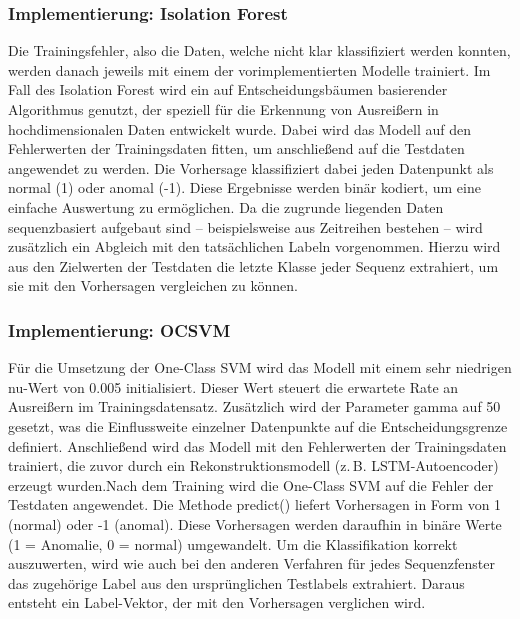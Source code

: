 \documentclass[a4paper,12pt]{article}
\begin{document}
	\subsubsection{Implementierung: Isolation Forest}
	Die Trainingsfehler, also die Daten, welche nicht klar klassifiziert werden konnten, werden danach jeweils mit einem der vorimplementierten Modelle trainiert. Im Fall des Isolation Forest wird ein auf Entscheidungsbäumen basierender Algorithmus genutzt, der speziell für die Erkennung von Ausreißern in hochdimensionalen Daten entwickelt wurde. Dabei wird das Modell auf den Fehlerwerten der Trainingsdaten fitten, um anschließend auf die Testdaten angewendet zu werden. Die Vorhersage klassifiziert dabei jeden Datenpunkt als normal (1) oder anomal (-1). Diese Ergebnisse werden binär kodiert, um eine einfache Auswertung zu ermöglichen. Da die zugrunde liegenden Daten sequenzbasiert aufgebaut sind – beispielsweise aus Zeitreihen bestehen – wird zusätzlich ein Abgleich mit den tatsächlichen Labeln vorgenommen. Hierzu wird aus den Zielwerten der Testdaten die letzte Klasse jeder Sequenz extrahiert, um sie mit den Vorhersagen vergleichen zu können.
	
	\subsubsection{Implementierung: OCSVM}
	Für die Umsetzung der One-Class SVM wird das Modell mit einem sehr niedrigen nu-Wert von 0.005 initialisiert. Dieser Wert steuert die erwartete Rate an Ausreißern im Trainingsdatensatz. Zusätzlich wird der Parameter gamma auf 50 gesetzt, was die Einflussweite einzelner Datenpunkte auf die Entscheidungsgrenze definiert. Anschließend wird das Modell mit den Fehlerwerten der Trainingsdaten trainiert, die zuvor durch ein Rekonstruktionsmodell (z.\,B. LSTM-Autoencoder) erzeugt wurden.Nach dem Training wird die One-Class SVM auf die Fehler der Testdaten angewendet. Die Methode predict() liefert Vorhersagen in Form von 1 (normal) oder -1 (anomal). Diese Vorhersagen werden daraufhin in binäre Werte (1 = Anomalie, 0 = normal) umgewandelt. Um die Klassifikation korrekt auszuwerten, wird wie auch bei den anderen Verfahren für jedes Sequenzfenster das zugehörige Label aus den ursprünglichen Testlabels extrahiert. Daraus entsteht ein Label-Vektor, der mit den Vorhersagen verglichen wird.
	
\end{document}
